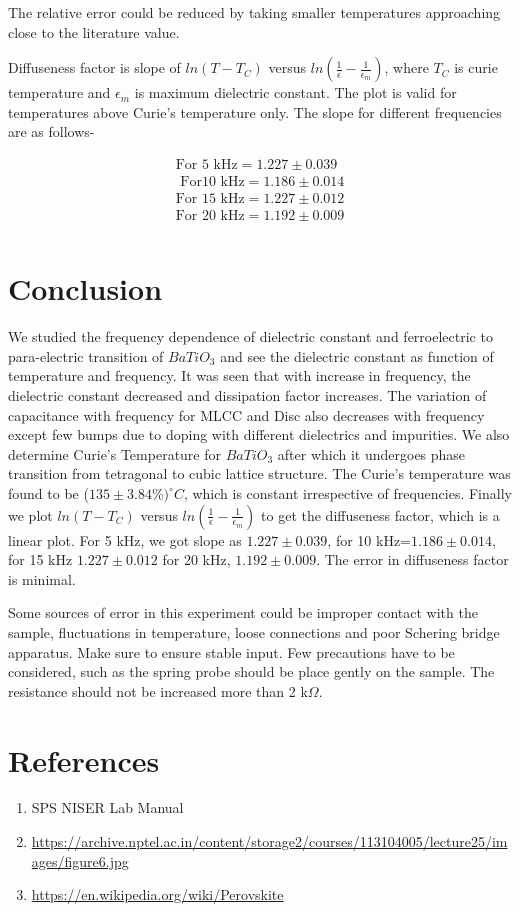 \documentclass[a4paper, amsfonts, amssymb, amsmath, reprint, showkeys, nofootinbib, twoside]{revtex4-1}
\begin{document}
The relative error could be reduced by taking smaller temperatures approaching close to the literature value.

Diffuseness factor is slope of $ln(T-T_C)$ versus $ln(\frac{1}{\epsilon}-\frac{1}{\epsilon_m})$, where $T_C$ is curie temperature and $\epsilon_m$ is maximum dielectric constant. The plot is valid for temperatures above Curie's temperature only. The slope for different frequencies are as follows-

\begin{align}
\text{For 5 kHz}=1.227\pm0.039\\
\text{ For10 kHz}=1.186\pm0.014\\
\text{For 15 kHz}=1.227\pm0.012\\
\text{For 20 kHz}=1.192\pm0.009\\
\end{align}

\section{Conclusion}
We studied the frequency dependence of dielectric constant and ferroelectric to para-electric transition of $BaTiO_3$ and see the dielectric constant as function of temperature and frequency. It was seen that with increase in frequency, the dielectric constant decreased and dissipation factor increases. The variation of capacitance with frequency for MLCC and Disc also decreases with frequency except few bumps due to doping with different dielectrics and impurities. We also determine Curie's Temperature for $BaTiO_3$ after which it undergoes phase transition from tetragonal to cubic lattice structure. The Curie's temperature was found to be ($135\pm3.84\%)^\circ C$, which is constant irrespective of frequencies. Finally we plot $ln(T-T_C)$ versus $ln(\frac{1}{\epsilon}-\frac{1}{\epsilon_m})$ to get the diffuseness factor, which is a linear plot. For 5 kHz, we got slope as $1.227\pm0.039$, for 10 kHz=$1.186\pm0.014$, for 15 kHz $1.227\pm0.012$ for 20 kHz, $1.192\pm0.009$. The error in diffuseness factor is minimal.

Some sources of error in this experiment could be improper contact with the sample, fluctuations in temperature, loose connections and poor Schering bridge apparatus. Make sure to ensure stable input. Few precautions have to be considered, such as the spring probe should be place gently on the sample. The resistance should not be increased more than 2 k$\Omega$.

\section{References}
\begin{enumerate}
\item{SPS NISER Lab Manual}
\item\url{https://archive.nptel.ac.in/content/storage2/courses/113104005/lecture25/images/figure6.jpg} \item {\url{https://en.wikipedia.org/wiki/Perovskite}}

\end{enumerate}
\end{document}
